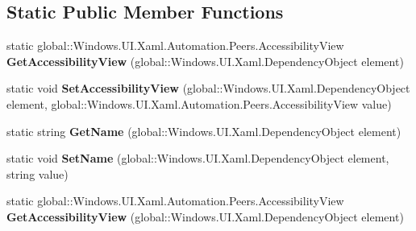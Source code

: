 \subsection*{Static Public Member Functions}
\begin{DoxyCompactItemize}
\item 
\mbox{\label{class_windows_1_1_u_i_1_1_xaml_1_1_automation_1_1_automation_properties_a31d697be3f31155ecf22e524a584d4dc}} 
static global\+::\+Windows.\+U\+I.\+Xaml.\+Automation.\+Peers.\+Accessibility\+View {\bfseries Get\+Accessibility\+View} (global\+::\+Windows.\+U\+I.\+Xaml.\+Dependency\+Object element)
\item 
\mbox{\label{class_windows_1_1_u_i_1_1_xaml_1_1_automation_1_1_automation_properties_aac7e51cabcc5d52f7def17b31f53f18b}} 
static void {\bfseries Set\+Accessibility\+View} (global\+::\+Windows.\+U\+I.\+Xaml.\+Dependency\+Object element, global\+::\+Windows.\+U\+I.\+Xaml.\+Automation.\+Peers.\+Accessibility\+View value)
\item 
\mbox{\label{class_windows_1_1_u_i_1_1_xaml_1_1_automation_1_1_automation_properties_a467b1c94670b22d8bd778de6351a09b5}} 
static string {\bfseries Get\+Name} (global\+::\+Windows.\+U\+I.\+Xaml.\+Dependency\+Object element)
\item 
\mbox{\label{class_windows_1_1_u_i_1_1_xaml_1_1_automation_1_1_automation_properties_a4f2659d7e86be152ef660f9c7e6fd422}} 
static void {\bfseries Set\+Name} (global\+::\+Windows.\+U\+I.\+Xaml.\+Dependency\+Object element, string value)
\item 
\mbox{\label{class_windows_1_1_u_i_1_1_xaml_1_1_automation_1_1_automation_properties_a31d697be3f31155ecf22e524a584d4dc}} 
static global\+::\+Windows.\+U\+I.\+Xaml.\+Automation.\+Peers.\+Accessibility\+View {\bfseries Get\+Accessibility\+View} (global\+::\+Windows.\+U\+I.\+Xaml.\+Dependency\+Object element)
\item 
\mbox{\label{class_windows_1_1_u_i_1_1_xaml_1_1_automation_1_1_automation_properties_aac7e51cabcc5d52f7def17b31f53f18b}} 

\end{DoxyCompactItemize}
